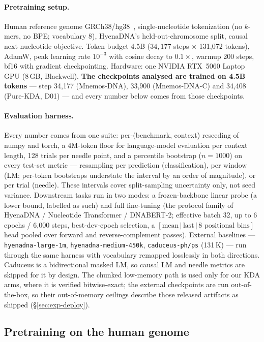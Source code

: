 \documentclass[11pt]{article}
\theoremstyle{plain}
\begin{document}
\paragraph{Pretraining setup.} Human reference genome GRCh38/hg38~\cite{schneider2017grch38},
single-nucleotide tokenization (no $k$-mers, no BPE; vocabulary 8), HyenaDNA's held-out-chromosome
split, causal next-nucleotide objective. Token budget 4.5B ($34{,}177$ steps $\times$ 131{,}072
tokens), AdamW, peak learning rate $10^{-3}$ with cosine decay to $0.1\times$, warmup 200 steps,
bf16 with gradient checkpointing. Hardware: one NVIDIA RTX~5060 Laptop GPU (8\,GB, Blackwell).
\textbf{The checkpoints analysed are trained on 4.5B tokens} --- step 34{,}177 (Mnemos-DNA),
33{,}900 (Mnemos-DNA-C) and 34{,}408 (Pure-KDA, D01) --- and every number below comes from those
checkpoints.

\paragraph{Evaluation harness.} Every number comes from one suite: per-(benchmark, context)
reseeding of numpy and torch, a 4M-token floor for language-model evaluation per context length,
128 trials per needle point, and a percentile bootstrap ($n{=}1000$) on every test-set metric ---
resampling per prediction (classification), per window (LM; per-token bootstraps understate the
interval by an order of magnitude), or per trial (needle). These intervals cover split-sampling
uncertainty only, not seed variance. Downstream tasks run in two modes: a frozen-backbone linear
probe (a lower bound, labelled as such) and full fine-tuning (the protocol family of
HyenaDNA / Nucleotide Transformer / DNABERT-2; effective batch 32, up to 6 epochs / 6{,}000 steps,
best-dev-epoch selection, a $[\text{mean}\,|\,\text{last}\,|\,\text{8 positional bins}]$ head
pooled over forward and reverse-complement passes). External baselines ---
\texttt{hyenadna-large-1m}, \texttt{hyenadna-medium-450k}, \texttt{caduceus-ph/ps} (131\,K) ---
run through the same harness with vocabulary remapped losslessly in both directions. Caduceus is a
bidirectional masked LM, so causal LM and needle metrics are skipped for it by design. The
chunked low-memory path is used only for our KDA arms, where it is verified bitwise-exact; the
external checkpoints are run out-of-the-box, so their out-of-memory ceilings describe those
released artifacts as shipped (\S\ref{sec:exp-deploy}).

\subsection{Pretraining on the human genome}\label{sec:exp-lm}
\end{document}
